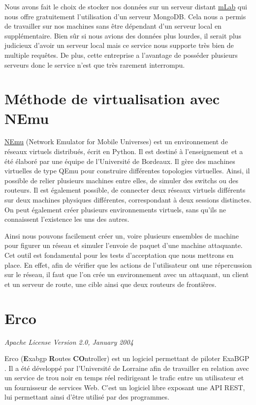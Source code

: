 Nous avons fait le choix de stocker nos données sur un serveur distant \href{https://mlab.com/}{mLab} qui nous offre gratuitement l'utilisation d'un serveur MongoDB. Cela nous a permis de travailler sur nos machines sans être dépendant d'un serveur local en supplémentaire. Bien sûr si nous avions des données plus lourdes, il serait plus judicieux d'avoir un serveur local mais ce service nous supporte très bien de multiple requêtes. De plus, cette entreprise a l'avantage de posséder plusieurs serveurs donc le service n'est que très rarement interrompu.

\section{Méthode de virtualisation avec NEmu}
\href{https://gitlab.com/v-a/nemu}{NEmu} (Network Emulator for Mobile Universes) est un environnement de réseaux virtuels distribués, écrit en Python. Il est destiné à l'enseignement et a été élaboré par une équipe de l'Université de Bordeaux. Il gère des machines virtuelles de type QEmu pour construire différentes topologies virtuelles. Ainsi, il possible de relier plusieurs machines entre elles, de simuler des switchs ou des routeurs. Il est également possible, de connecter deux réseaux virtuels différents sur deux machines physiques différentes, correspondant à deux sessions distinctes. On peut également créer plusieurs environnements virtuels, sans qu'ils ne connaissent l'existence les uns des autres.

Ainsi nous pouvons facilement créer un, voire plusieurs ensembles de machine pour figurer un réseau et simuler l'envoie de paquet d'une machine attaquante. Cet outil est fondamental pour les tests d'acceptation que nous mettrons en place. En effet, afin de vérifier que les actions de l'utilisateur ont une répercussion sur le réseau, il faut que l'on crée un environnement avec un attaquant, un client et un serveur de route, une cible ainsi que deux routeurs de frontières.

\section{Erco}
\textit{Apache License Version 2.0, January 2004}

Erco (\textbf{E}xabgp \textbf{R}outes \textbf{CO}ntroller) est un logiciel permettant de piloter ExaBGP \cite{Did15}. Il a été développé par l'Université de Lorraine afin de travailler en relation avec un service de trou noir en temps réel redirigeant le trafic entre un utilisateur et un fournisseur de services Web. C'est un logiciel libre exposant une API REST, lui permettant ainsi d'être utilisé par des programmes.

